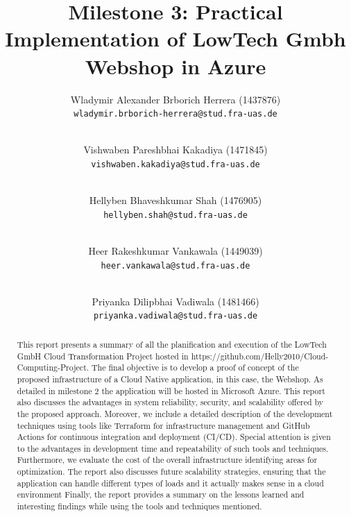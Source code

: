 \documentclass{llncs}
\newcommand{\what}{Milestone 3: Practical Implementation of LowTech Gmbh Webshop in Azure}
\begin{document}
%
%
%
\mainmatter              %
%
\title{\what}
%
\author{
    Wladymir Alexander Brborich Herrera (1437876)\\
    \texttt{wladymir.brborich-herrera@stud.fra-uas.de}
    \and\\
    Vishwaben Pareshbhai Kakadiya (1471845)\\
    \texttt{vishwaben.kakadiya@stud.fra-uas.de}
    \and\\
    Hellyben Bhaveshkumar Shah (1476905)\\
    \texttt{hellyben.shah@stud.fra-uas.de}
    \and\\
    Heer Rakeshkumar Vankawala (1449039)
    \\
    \texttt{heer.vankawala@stud.fra-uas.de}
    \and\\
    Priyanka Dilipbhai Vadiwala (1481466)\\
    \texttt{priyanka.vadiwala@stud.fra-uas.de}
}
%

\maketitle              %

\begin{abstract}
    This report presents a summary of all the planification and execution of the LowTech GmbH Cloud Transformation Project hosted in  https://github.com/Helly2010/Cloud-Computing-Project.
    The final objective is to develop a proof of concept of the proposed infrastructure of a Cloud Native application, in this case,
    the Webshop. As detailed in milestone 2 the application will be hosted in Microsoft Azure. This report also discusses the advantages
    in system reliability, security, and scalability offered by the proposed approach.
    Moreover, we include a detailed description of the development techniques using tools like Terraform for infrastructure management and GitHub Actions for
    continuous integration and deployment (CI/CD). Special attention is given to the advantages in development time and repeatability of such tools and techniques.
    Furthermore, we evaluate the cost of the overall infrastructure identifying areas for optimization.
    The report also discusses future scalability strategies, ensuring that the application can handle different types of loads and it actually makes sense in a cloud environment
    Finally, the report provides a summary on the lessons learned and interesting findings while using the tools and techniques mentioned.

\end{abstract}
\end{document}
